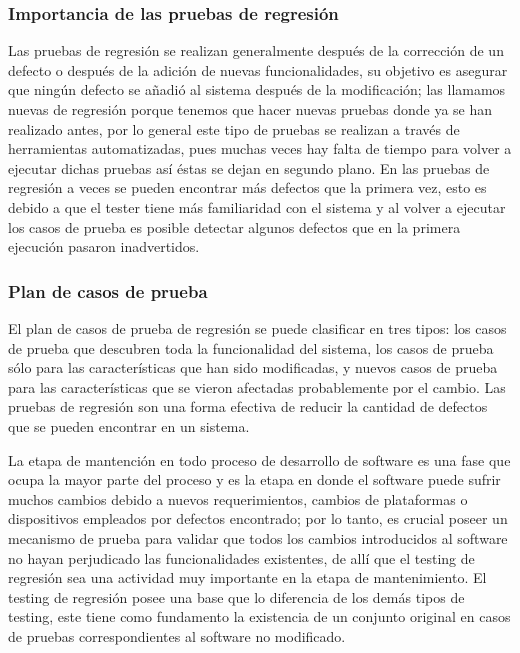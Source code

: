 \documentclass[conference]{IEEEtran}
\begin{document}
\subsubsection{Importancia de las pruebas de regresión}

Las pruebas de regresión se realizan generalmente después de la corrección de un defecto o después de la adición de nuevas funcionalidades, su objetivo es asegurar que ningún defecto se añadió al sistema después de la modificación; las llamamos nuevas de regresión porque tenemos que hacer nuevas pruebas donde ya se han realizado antes, por lo general este tipo de pruebas se realizan a través de herramientas automatizadas, pues muchas veces hay falta de tiempo para volver a ejecutar dichas pruebas así éstas se dejan en segundo plano. En las pruebas de regresión a veces se pueden encontrar más defectos que la primera vez, esto es debido a que el tester tiene más familiaridad con el sistema y al volver a ejecutar los casos de prueba es posible detectar algunos defectos que en la primera ejecución pasaron inadvertidos.

\subsubsection{Plan de casos de prueba}
 
 El plan de casos de prueba de regresión se puede clasificar en tres tipos: los casos de prueba que descubren toda la funcionalidad del sistema, los casos de prueba sólo para las características que han sido modificadas, y nuevos casos de prueba para las características que se vieron afectadas probablemente por el cambio. Las pruebas de regresión son una forma efectiva de reducir la cantidad de defectos que se pueden encontrar en un sistema.


 La etapa de mantención en todo proceso de desarrollo de software es una fase que ocupa la mayor parte del proceso y es la etapa en donde el software puede sufrir muchos cambios debido a nuevos requerimientos, cambios de plataformas o dispositivos empleados por defectos encontrado; por lo tanto, es crucial poseer un mecanismo de prueba para validar que todos los cambios introducidos al software no hayan perjudicado las funcionalidades existentes, de allí que el testing de regresión sea una actividad muy importante en la etapa de mantenimiento. El testing de regresión posee una base que lo diferencia de los demás tipos de testing, este tiene como fundamento la existencia de un conjunto original en casos de pruebas correspondientes al software no modificado. 
 
\end{document}
